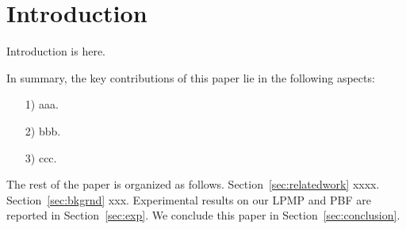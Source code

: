 \presec
\section{Introduction} \postsec
\label{sec:introduction}

Introduction is here.

In summary, the key contributions of this paper lie in the following aspects:
\begin{itemize}
\item[1)] aaa.
\item[2)] bbb.
\item[3)] ccc.
\end{itemize}

The rest of the paper is organized as follows.
%
Section~\ref{sec:relatedwork} xxxx.
%
Section~\ref{sec:bkgrnd} xxx.
%
Experimental results on our LPMP and PBF are reported in Section~\ref{sec:exp}.
%
We conclude this paper in Section~\ref{sec:conclusion}.
